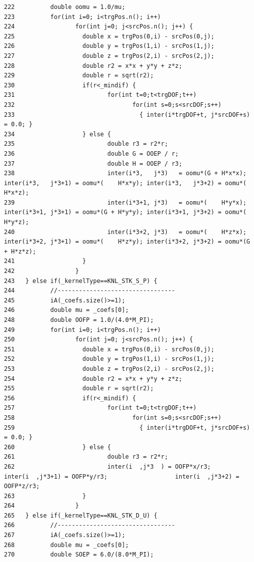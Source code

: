 \begin{verbatim}
222          double oomu = 1.0/mu;
223          for(int i=0; i<trgPos.n(); i++)
224                 for(int j=0; j<srcPos.n(); j++) {
225                   double x = trgPos(0,i) - srcPos(0,j);
226                   double y = trgPos(1,i) - srcPos(1,j);
227                   double z = trgPos(2,i) - srcPos(2,j);
228                   double r2 = x*x + y*y + z*z;
229                   double r = sqrt(r2);
230                   if(r<_mindif) {
231                          for(int t=0;t<trgDOF;t++)
232                                 for(int s=0;s<srcDOF;s++)
233                                   { inter(i*trgDOF+t, j*srcDOF+s) = 0.0; }
234                   } else {
235                          double r3 = r2*r;
236                          double G = OOEP / r;
237                          double H = OOEP / r3;
238                          inter(i*3,   j*3)   = oomu*(G + H*x*x); inter(i*3,   j*3+1) = oomu*(    H*x*y); inter(i*3,   j*3+2) = oomu*(    H*x*z);
239                          inter(i*3+1, j*3)   = oomu*(    H*y*x); inter(i*3+1, j*3+1) = oomu*(G + H*y*y); inter(i*3+1, j*3+2) = oomu*(    H*y*z);
240                          inter(i*3+2, j*3)   = oomu*(    H*z*x); inter(i*3+2, j*3+1) = oomu*(    H*z*y); inter(i*3+2, j*3+2) = oomu*(G + H*z*z);
241                   }
242                 }
243   } else if(_kernelType==KNL_STK_S_P) {
244          //---------------------------------
245          iA(_coefs.size()>=1);
246          double mu = _coefs[0];
248          double OOFP = 1.0/(4.0*M_PI);
249          for(int i=0; i<trgPos.n(); i++)
250                 for(int j=0; j<srcPos.n(); j++) {
251                   double x = trgPos(0,i) - srcPos(0,j);
252                   double y = trgPos(1,i) - srcPos(1,j);
253                   double z = trgPos(2,i) - srcPos(2,j);
254                   double r2 = x*x + y*y + z*z;
255                   double r = sqrt(r2);
256                   if(r<_mindif) {
257                          for(int t=0;t<trgDOF;t++)
258                                 for(int s=0;s<srcDOF;s++)
259                                   { inter(i*trgDOF+t, j*srcDOF+s) = 0.0; }
260                   } else {
261                          double r3 = r2*r;
262                          inter(i  ,j*3  ) = OOFP*x/r3;                   inter(i  ,j*3+1) = OOFP*y/r3;                   inter(i  ,j*3+2) = OOFP*z/r3;
263                   }
264                 }
265   } else if(_kernelType==KNL_STK_D_U) {
266          //---------------------------------
267          iA(_coefs.size()>=1);
268          double mu = _coefs[0];
270          double SOEP = 6.0/(8.0*M_PI);

\end{verbatim}

